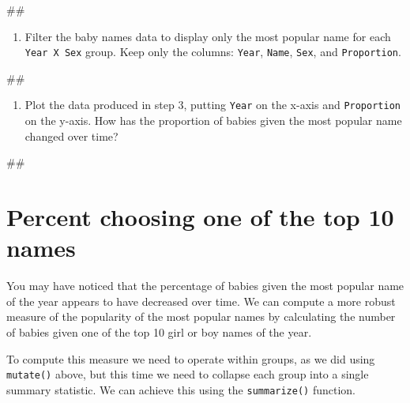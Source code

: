 \documentclass[]{book}
\newenvironment{Shaded}{\begin{snugshade}}{\end{snugshade}}
\newcommand{\NormalTok}[1]{#1}
\providecommand{\tightlist}{%
  \setlength{\itemsep}{0pt}\setlength{\parskip}{0pt}}
\begin{document}
\begin{Shaded}
\begin{Highlighting}[]
\NormalTok{##}
\end{Highlighting}
\end{Shaded}

\begin{enumerate}
\def\labelenumi{\arabic{enumi}.}
\setcounter{enumi}{2}
\tightlist
\item
  Filter the baby names data to display only the most popular name for
  each \texttt{Year\ X\ Sex} group. Keep only the columns:
  \texttt{Year}, \texttt{Name}, \texttt{Sex}, and \texttt{Proportion}.
\end{enumerate}

\begin{Shaded}
\begin{Highlighting}[]
\NormalTok{##}
\end{Highlighting}
\end{Shaded}

\begin{enumerate}
\def\labelenumi{\arabic{enumi}.}
\setcounter{enumi}{3}
\tightlist
\item
  Plot the data produced in step 3, putting \texttt{Year} on the x-axis
  and \texttt{Proportion} on the y-axis. How has the proportion of
  babies given the most popular name changed over time?
\end{enumerate}

\begin{Shaded}
\begin{Highlighting}[]
\NormalTok{##}
\end{Highlighting}
\end{Shaded}

\section{Percent choosing one of the top 10
names}\label{percent-choosing-one-of-the-top-10-names}

You may have noticed that the percentage of babies given the most
popular name of the year appears to have decreased over time. We can
compute a more robust measure of the popularity of the most popular
names by calculating the number of babies given one of the top 10 girl
or boy names of the year.

To compute this measure we need to operate within groups, as we did
using \texttt{mutate()} above, but this time we need to collapse each
group into a single summary statistic. We can achieve this using the
\texttt{summarize()} function.
\end{document}
